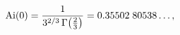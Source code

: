 \[\mathop{\mathrm{Ai}\/}\nolimits\!\left(0\right)=\frac{1}{3^{2/3}\mathop{\Gamma%
\/}\nolimits\!\left(\tfrac{2}{3}\right)}=0.35502\;80538\ldots,\]